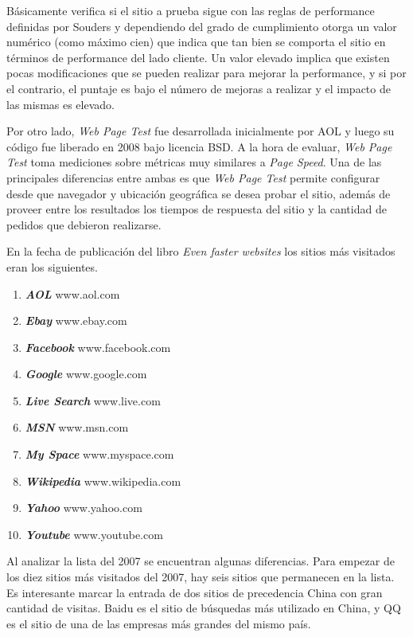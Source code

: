 Básicamente verifica si el sitio a prueba sigue con las reglas de performance definidas por Souders y dependiendo del grado de cumplimiento otorga un valor
numérico (como máximo cien) que indica que tan bien se comporta el sitio en términos de performance del lado cliente. Un valor elevado implica que existen pocas modificaciones
que se pueden realizar para mejorar la performance, y si por el contrario, el puntaje es bajo el número de mejoras a realizar y el impacto de las mismas es elevado.

Por otro lado, \emph{Web Page Test} fue desarrollada inicialmente por AOL y luego su código fue liberado en 2008 bajo licencia BSD.
A la hora de evaluar, \emph{Web Page Test} toma mediciones sobre métricas muy similares a \emph{Page Speed}. Una de las principales diferencias entre ambas es que
\emph{Web Page Test} permite configurar desde que navegador y ubicación geográfica se desea probar el sitio, además de proveer entre
los resultados los tiempos de respuesta del sitio y la cantidad de pedidos que debieron realizarse.

En la fecha de publicación del libro \emph{Even faster websites} \cite{souders2009even} los sitios más visitados eran los siguientes.

\begin{enumerate}
	\item
	\textbf{\emph{AOL}} www.aol.com
	\item
	\textbf{\emph{Ebay}} www.ebay.com
	\item
	\textbf{\emph{Facebook}} www.facebook.com
	\item
	\textbf{\emph{Google}} www.google.com
	\item
	\textbf{\emph{Live Search}} www.live.com
	\item
	\textbf{\emph{MSN}} www.msn.com
	\item
	\textbf{\emph{My Space}} www.myspace.com
	\item
	\textbf{\emph{Wikipedia}} www.wikipedia.com
	\item
	\textbf{\emph{Yahoo}} www.yahoo.com
	\item
	\textbf{\emph{Youtube}} www.youtube.com
\end{enumerate}

Al analizar la lista del 2007 se encuentran algunas diferencias. Para empezar de los diez sitios más visitados del 2007, hay seis sitios que permanecen en la lista.
Es interesante marcar la entrada de dos sitios de precedencia China con gran cantidad de visitas. Baidu es el sitio de búsquedas más utilizado en China, y QQ
es el sitio de una de las empresas más grandes del mismo país.

